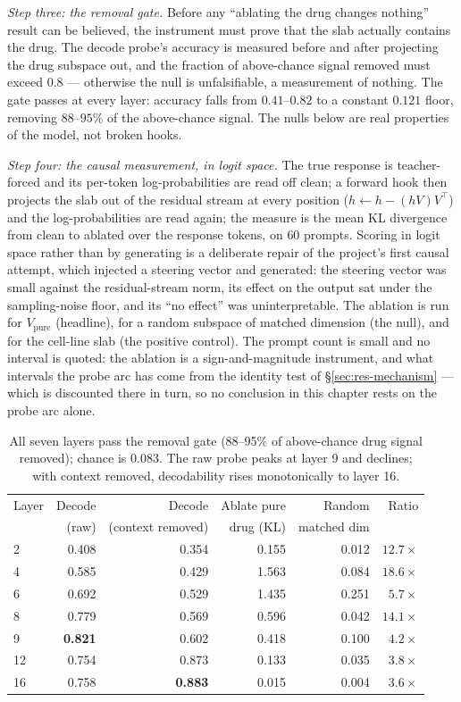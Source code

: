 \emph{Step three: the removal gate.} Before any ``ablating the drug changes nothing'' result can be
believed, the instrument must prove that the slab actually contains the drug. The decode probe's
accuracy is measured before and after projecting the drug subspace out, and the fraction of
above-chance signal removed must exceed $0.8$ --- otherwise the null is unfalsifiable, a measurement
of nothing. The gate passes at every layer: accuracy falls from $0.41$--$0.82$ to a constant $0.121$
floor, removing $88$--$95\%$ of the above-chance signal. The nulls below are real properties of the
model, not broken hooks.

\emph{Step four: the causal measurement, in logit space.} The true response is teacher-forced and
its per-token log-probabilities are read off clean; a forward hook then projects the slab out of the
residual stream at every position ($h \leftarrow h - (hV)V^{\top}$) and the log-probabilities are
read again; the measure is the mean KL divergence from clean to ablated over the response tokens, on
$60$ prompts. Scoring in logit space rather than by generating is a deliberate repair of the
project's first causal attempt, which injected a steering vector and generated: the steering vector
was small against the residual-stream norm, its effect on the output sat under the sampling-noise
floor, and its ``no effect'' was uninterpretable. The ablation is run for $V_{\textrm{pure}}$
(headline), for a random subspace of matched dimension (the null), and for the cell-line slab (the
positive control). The prompt count is small and no interval is quoted: the ablation is a
sign-and-magnitude instrument, and what intervals the probe arc has come from the identity test of
\S\ref{sec:res-mechanism} --- which is discounted there in turn, so no conclusion in this chapter
rests on the probe arc alone.

\begin{table}[htbp]
\centering
\begin{tabular}{lrrrrr}
\toprule
Layer & Decode & Decode & Ablate pure & Random & Ratio \\
 & (raw) & (context removed) & drug (KL) & matched dim & \\
\midrule
2 & 0.408 & 0.354 & 0.155 & 0.012 & $12.7\times$ \\
4 & 0.585 & 0.429 & 1.563 & 0.084 & $18.6\times$ \\
6 & 0.692 & 0.529 & 1.435 & 0.251 & $5.7\times$ \\
8 & 0.779 & 0.569 & 0.596 & 0.042 & $14.1\times$ \\
9 & \textbf{0.821} & 0.602 & 0.418 & 0.100 & $4.2\times$ \\
12 & 0.754 & 0.873 & 0.133 & 0.035 & $3.8\times$ \\
16 & 0.758 & \textbf{0.883} & 0.015 & 0.004 & $3.6\times$ \\
\bottomrule
\end{tabular}
\caption{All seven layers pass the removal gate (88--95\% of above-chance drug signal removed);
chance is $0.083$. The raw probe peaks at layer 9 and declines; with context removed, decodability
rises monotonically to layer 16.}
\label{tab:workspace}
\end{table}

